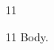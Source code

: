 \documentclass[paper=A4]{ropas-poster}
\begin{document}
\begin{postergrid}{1}{1}
\begin{posterblock}{1}{1}
Body.
\end{posterblock}
\end{postergrid}
\end{document}
